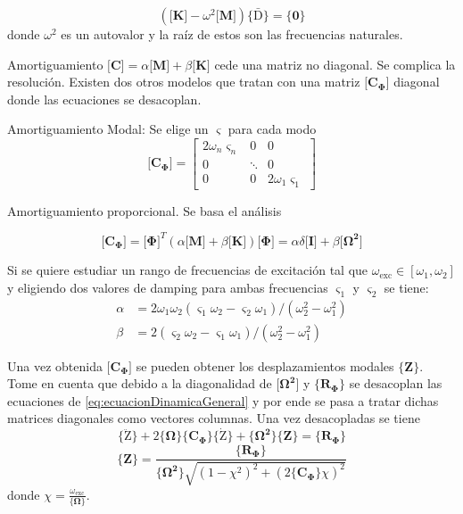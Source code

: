 \documentclass[11pt, a4paper,titlepage]{article}
\newcommand{\Phib}{\boldsymbol{\Phi}}
\newcommand{\Omegab}{\boldsymbol{\Omega}}
\newcommand{\COmega}{\Cme{\Omegab}}
\newcommand{\Mme}[1]{\boldsymbol{[}\mathbf{#1} \boldsymbol{]}}
\newcommand{\Cme}[1]{\boldsymbol{\{ }\mathbf{#1} \boldsymbol{\}} }
\newcommand{\MK}{\Mme{K}}
\newcommand{\modal}{{_{\Phib}}}
\newcommand{\dampfact}{\varsigma}
\begin{document}
\[
\left( \MK - \omega^2 \Mme{M} \right)\Cme{\boldsymbol{\bar{\mathrm D}}} = \Cme{0}
\]
donde $\omega^2$ es un autovalor y la raíz de estos son las frecuencias naturales.




Amortiguamiento $\Mme{C} = \alpha \Mme{M}+\beta \Mme{K}$ cede una matriz no diagonal. Se complica la resolución. Existen dos otros modelos que tratan con una matriz $\Mme{C\modal}$ diagonal donde las ecuaciones se desacoplan.


Amortiguamiento Modal: Se elige un $\dampfact$ para cada modo
\begin{equation}
\Mme{C\modal}=\left[ \begin{array}{ccc}{2 \omega_{n} \dampfact_{n}} & {0} & {0} \\ {0} & {\ddots} & {0} \\ {0} & {0} & {2 \omega_{1} \dampfact_{1}}\end{array}\right]
\end{equation}

Amortiguamiento proporcional. Se basa el análisis 

\begin{equation}
	\Mme{C\modal} = \Mme{\Phib}^T ( \alpha \Mme{M}+\beta \Mme{K})\Mme{\Phib} = \alpha \delta \Mme{I} +\beta \Mme{\Omegab^2}
\end{equation}

Si se quiere estudiar un rango de frecuencias de excitación tal que $\omega_{\mathrm{exc}}\in [\omega_1, \omega_2]$ y eligiendo dos valores de damping para ambas frecuencias $\dampfact_1$ y $\dampfact_2$ se tiene:
\begin{align*}
\alpha &= 2\omega_1 \omega_2 (\dampfact_1 \omega_2 -\dampfact_2 \omega_1)/(\omega_2^2 - \omega_1^2) \\ \beta &= 2(\dampfact_2\omega_2 -\dampfact_1 \omega_1)/(\omega_2^2 - \omega_1^2)
\end{align*}

Una vez obtenida $\Mme{C\modal}$ se pueden obtener los desplazamientos modales $\Cme{Z}$. Tome en cuenta que debido a la diagonalidad de $\Mme{\Omegab^2}$ y $\Cme{R\modal }$ se desacoplan las ecuaciones de \ref{eq:ecuacionDinamicaGeneral} y por ende se pasa a tratar dichas matrices diagonales como vectores columnas. Una vez desacopladas se tiene
 \[\Cme{\boldsymbol{\ddot{\mathrm{Z}}}}+2\COmega \Cme{C\modal} \Cme{\boldsymbol{\dot{\mathrm{Z}}}} + \Cme{\Omegab^2} \Cme{Z} = \Cme{R\modal} \]
\[
\Cme{Z} = \frac{\Cme{R\modal }}{ \Cme{\Omegab^2} \sqrt{(1-\chi^2)^2 + (2 \Cme{C\modal} \chi)^2}}
\]
donde $\chi = \frac{\omega_{\mathrm{exc}}}{\COmega}$. 
\end{document}
